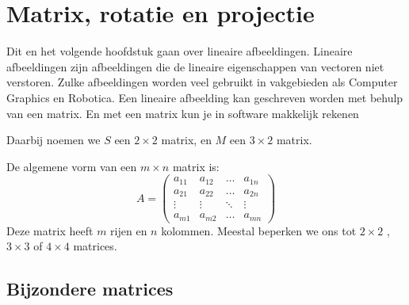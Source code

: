 \chapter{Matrix, rotatie en projectie}
\label{chap: matrix, rotatie en projectie}

Dit en het volgende hoofdstuk gaan over lineaire afbeeldingen. Lineaire afbeeldingen zijn afbeeldingen die de lineaire eigenschappen van  vectoren niet verstoren. Zulke afbeeldingen worden veel gebruikt in vakgebieden als Computer Graphics en Robotica. Een lineaire afbeelding kan geschreven worden met behulp van een matrix. En met een matrix kun je in software makkelijk rekenen


Daarbij noemen we $S$ een $2 \times 2$ matrix, en $M$ een $3 \times 2$ matrix. 

De algemene vorm van een $m \times n$ matrix is:
\[
    A = \begin{pmatrix}
        a_{11}  &  a_{12} & \ldots & a_{1n} \\
        a_{21}  &  a_{22} & \ldots & a_{2n} \\
        \vdots  & \vdots  & \ddots & \vdots \\
        a_{m1}  & a_{m2}  & \ldots & a_{mn}
    \end{pmatrix}
\]
Deze matrix heeft $ m $ rijen en $ n $ kolommen. Meestal beperken we ons tot $ 2 \times 2 $ , \  $ 3 \times 3 $ of $ 4 \times 4 $ matrices.
\section{Bijzondere matrices}
 

